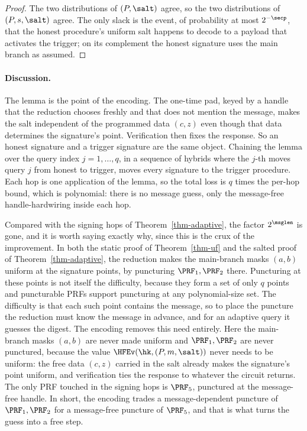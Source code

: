 \begin{proof}
The two distributions of $(P, \salt)$ agree, so the two distributions of $(P, s, \salt)$ agree. The only slack is the event, of probability at most $2^{-\secp}$, that the honest procedure's uniform salt happens to decode to a payload that activates the trigger; on its complement the honest signature uses the main branch as assumed.
\end{proof}

\paragraph*{Discussion.} The lemma is the point of the encoding. The one-time pad, keyed by a handle that the reduction chooses freshly and that does not mention the message, makes the salt independent of the programmed data $(c, z)$ even though that data determines the signature's point. Verification then fixes the response. So an honest signature and a trigger signature are the same object. Chaining the lemma over the query index $j = 1, \ldots, q$, in a sequence of hybrids where the $j$-th moves query $j$ from honest to trigger, moves every signature to the trigger procedure. Each hop is one application of the lemma, so the total loss is $q$ times the per-hop bound, which is polynomial: there is no message guess, only the message-free handle-hardwiring inside each hop.

Compared with the signing hops of Theorem~\ref{thm-adaptive}, the factor $2^{\msglen}$ is gone, and it is worth saying exactly why, since this is the crux of the improvement. In both the static proof of Theorem~\ref{thm-uf} and the salted proof of Theorem~\ref{thm-adaptive}, the reduction makes the main-branch masks $(a,b)$ uniform at the signature points, by puncturing $\PRF_1, \PRF_2$ there. Puncturing at these points is not itself the difficulty, because they form a set of only $q$ points and puncturable PRFs support puncturing at any polynomial-size set. The difficulty is that each such point contains the message, so to place the puncture the reduction must know the message in advance, and for an adaptive query it guesses the digest. The encoding removes this need entirely. Here the main-branch masks $(a,b)$ are never made uniform and $\PRF_1, \PRF_2$ are never punctured, because the value $\HFEv(\hk, (P,m,\salt))$ never needs to be uniform: the free data $(c,z)$ carried in the salt already makes the signature's point uniform, and verification ties the response to whatever the circuit returns. The only PRF touched in the signing hops is $\PRF_5$, punctured at the message-free handle. In short, the encoding trades a message-dependent puncture of $\PRF_1, \PRF_2$ for a message-free puncture of $\PRF_5$, and that is what turns the guess into a free step.

